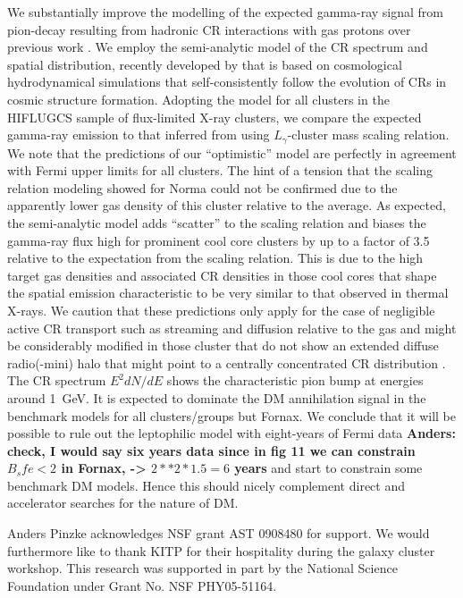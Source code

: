 \documentclass[10pt,aps,pra,reprint,amsmath,amsfonts,amssymb,showpacs,nofootinbib,floatfix]{revtex4-1}
\begin{document}
We substantially improve the modelling of the expected gamma-ray
signal from pion-decay resulting from hadronic CR interactions with
gas protons over previous work \citep{2010ApJ...717L..71A}. We employ
the semi-analytic model of the CR spectrum and spatial distribution,
recently developed by \citet{2010MNRAS.409..449P} that is based on
cosmological hydrodynamical simulations that self-consistently follow
the evolution of CRs in cosmic structure formation. Adopting the model
for all clusters in the HIFLUGCS sample of flux-limited X-ray
clusters, we compare the expected gamma-ray emission to that inferred
from using $L_\gamma$-cluster mass scaling relation. We note that the
predictions of our ``optimistic'' model are perfectly in agreement
with Fermi upper limits for all clusters.  The hint of a tension that
the scaling relation modeling showed for Norma
\citep{2010ApJ...717L..71A} could not be confirmed due to the
apparently lower gas density of this cluster relative to the average.
As expected, the semi-analytic model adds ``scatter'' to the scaling
relation and biases the gamma-ray flux high for prominent cool core
clusters by up to a factor of 3.5 relative to the expectation from the
scaling relation. This is due to the high target gas densities and
associated CR densities in those cool cores that shape the spatial
emission characteristic to be very similar to that observed in thermal
X-rays. We caution that these predictions only apply for the case of
negligible active CR transport such as streaming and diffusion
relative to the gas and might be considerably modified in those
cluster that do not show an extended diffuse radio(-mini) halo that
might point to a centrally concentrated CR distribution
\citep{2011A&A...527A..99E}. The CR spectrum $E^2 dN/dE$ shows the
characteristic pion bump at energies around 1~GeV. It is expected to
dominate the DM annihilation signal in the benchmark models for all
clusters/groups but Fornax. We conclude that it will be possible to
rule out the leptophilic model with eight-years of Fermi data {\bf
  Anders: check, I would say six years data since in fig 11 we can
  constrain $B_sfe < 2$ in Fornax, -> $2**2*1.5 = 6$ years} and start
to constrain some benchmark DM models. Hence this should nicely
complement direct and accelerator searches for the nature of DM.






\smallskip Anders Pinzke acknowledges NSF grant AST 0908480 for
support. We would furthermore like to thank KITP for their hospitality
during the galaxy cluster workshop.  This research was supported in
part by the National Science Foundation under Grant No. NSF
PHY05-51164.
\end{document}
